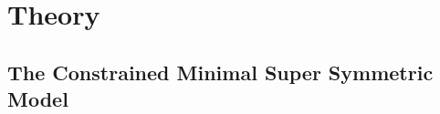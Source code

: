 \chapter{Theory} %
\label{cha:theory}

\section{The Constrained Minimal Super Symmetric Model} %
\label{sec:the_constrained_minimal_super_symmetric_model}


